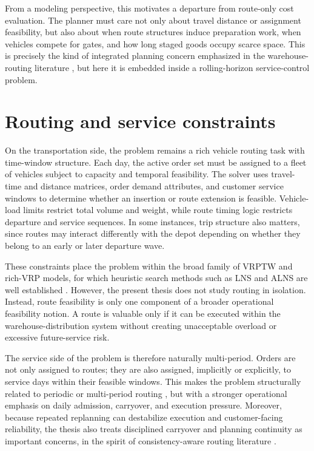 From a modeling perspective, this motivates a departure from route-only cost evaluation. The planner must care not only about travel distance or assignment feasibility, but also about when route structures induce preparation work, when vehicles compete for gates, and how long staged goods occupy scarce space. This is precisely the kind of integrated planning concern emphasized in the warehouse-routing literature \cite{vangils2018review,vangils2021integratedpickroute}, but here it is embedded inside a rolling-horizon service-control problem.

\section{Routing and service constraints}

On the transportation side, the problem remains a rich vehicle routing task with time-window structure. Each day, the active order set must be assigned to a fleet of vehicles subject to capacity and temporal feasibility. The solver uses travel-time and distance matrices, order demand attributes, and customer service windows to determine whether an insertion or route extension is feasible. Vehicle-load limits restrict total volume and weight, while route timing logic restricts departure and service sequences. In some instances, trip structure also matters, since routes may interact differently with the depot depending on whether they belong to an early or later departure wave.

These constraints place the problem within the broad family of VRPTW and rich-VRP models, for which heuristic search methods such as LNS and ALNS are well established \cite{shaw1998lns,ropke2006alns,pisinger2010lns,subramanian2013richvrp}. However, the present thesis does not study routing in isolation. Instead, route feasibility is only one component of a broader operational feasibility notion. A route is valuable only if it can be executed within the warehouse-distribution system without creating unacceptable overload or excessive future-service risk.

The service side of the problem is therefore naturally multi-period. Orders are not only assigned to routes; they are also assigned, implicitly or explicitly, to service days within their feasible windows. This makes the problem structurally related to periodic or multi-period routing \cite{francis2008pvrp,kovacs2014multiperiod}, but with a stronger operational emphasis on daily admission, carryover, and execution pressure. Moreover, because repeated replanning can destabilize execution and customer-facing reliability, the thesis also treats disciplined carryover and planning continuity as important concerns, in the spirit of consistency-aware routing literature \cite{groer2009consistentvrp,coelho2012consistency}.

